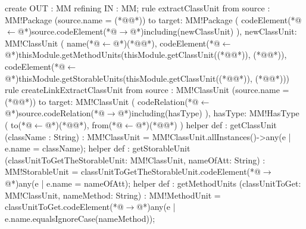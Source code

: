\begin{enumerate}
\begin{enumerate}
\begin{codigo}
create OUT : MM refining IN : MM;
rule extractClassUnit {
	from
		source : MM!Package (source.name = (*@@*))
	to 
		target: MM!Package (
			codeElement(*@$\leftarrow$@*)source.codeElement(*@$\rightarrow$@*)including(newClassUnit)
		),
		newClassUnit: MM!ClassUnit (
			name(*@$\leftarrow$@*)(*@@*),
			codeElement(*@$\leftarrow$@*)thisModule.getMethodUnits(thisModule.getClassUnit((*@@*)), (*@@*)),
			codeElement(*@$\leftarrow$@*)thisModule.getStorableUnits(thisModule.getClassUnit((*@@*)), (*@@*)))
rule createLinkExtractClassUnit {
	from
		source : MM!ClassUnit (source.name = (*@@*))
	to 
		target: MM!ClassUnit (
			codeRelation(*@$\leftarrow$@*)source.codeRelation(*@$\rightarrow$@*)including(hasType)
		),
		hasType: MM!HasType (
			to(*@$\leftarrow$@*)(*@@*),
			from(*@$\leftarrow$@*)(*@@*)
		)
}}
helper def : getClassUnit (className : String) : MM!ClassUnit = MM!ClassUnit.allInstances()->any(e | e.name = className);
helper def : getStorableUnit (classUnitToGetTheStorableUnit: MM!ClassUnit, nameOfAtt: String) : MM!StorableUnit = classUnitToGetTheStorableUnit.codeElement(*@$\rightarrow$@*)any(e | e.name = nameOfAtt);		
helper def : getMethodUnits (classUnitToGet: MM!ClassUnit, nameMethod: String) : MM!MethodUnit = classUnitToGet.codeElement(*@$\rightarrow$@*)any(e | e.name.equalsIgnoreCase(nameMethod));
\end{codigo}

\end{enumerate}
\end{enumerate}
